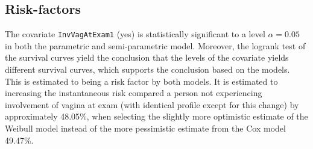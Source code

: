 \documentclass[
]{article}
\begin{document}
\hypertarget{risk-factors}{%
\subsection{Risk-factors}\label{risk-factors}}

The covariate \texttt{InvVagAtExam1} (yes) is statistically significant to a level \(\alpha = 0.05\) in both the parametric and semi-parametric model. Moreover, the logrank test of the survival curves yield the conclusion that the levels of the covariate yields different survival curves, which supports the conclusion based on the models. This is estimated to being a risk factor by both models. It is estimated to increasing the instantaneous risk compared a person not experiencing involvement of vagina at exam (with identical profile except for this change) by approximately 48.05\%, when selecting the slightly more optimistic estimate of the Weibull model instead of the more pessimistic estimate from the Cox model 49.47\%.
\end{document}
